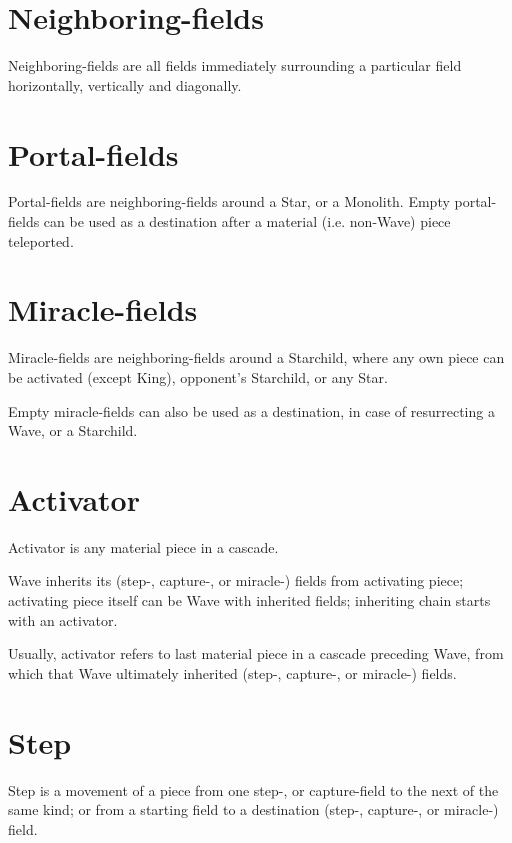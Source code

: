 \section*{Neighboring-fields}
\label{sec:Terms/Neighboring-fields}
Neighboring-fields are all fields immediately surrounding a particular field
horizontally, vertically and diagonally.

\section*{Portal-fields}
\label{sec:Terms/Portal-fields}
Portal-fields are neighboring-fields around a Star, or a Monolith. Empty
portal-fields can be used as a destination after a material (i.e. non-Wave)
piece teleported.

\section*{Miracle-fields}
\label{sec:Terms/Royal-fields}
Miracle-fields are neighboring-fields around a Starchild, where any own piece
can be activated (except King), opponent's Starchild, or any Star.

Empty miracle-fields can also be used as a destination, in case of resurrecting
a Wave, or a Starchild.

\section*{Activator}
\label{sec:Terms/Activator}
Activator is any material piece in a cascade.

Wave inherits its (step-, capture-, or miracle-) fields from activating piece;
activating piece itself can be Wave with inherited fields; inheriting chain
starts with an activator.

Usually, activator refers to last material piece in a cascade preceding Wave,
from which that Wave ultimately inherited (step-, capture-, or miracle-) fields.

\section*{Step}
\label{sec:Terms/Step}
Step is a movement of a piece from one step-, or capture-field to the next of
the same kind; or from a starting field to a destination (step-, capture-, or
miracle-) field.


